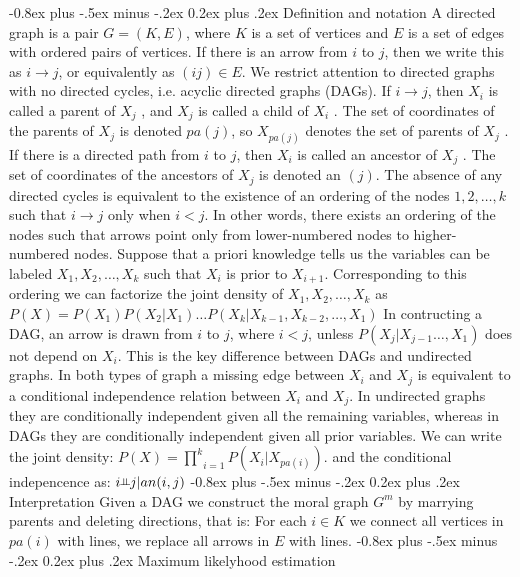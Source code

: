 \documentclass[8pt,landscape]{extarticle}
\makeatletter
\newcommand{\indep}{\rotatebox[origin=c]{90}{$\vDash$}}
\renewcommand{\subsection}{\@startsection{subsection}{2}{0mm}%
                                {-0.8ex plus -.5ex minus -.2ex}%
                                {0.2ex plus .2ex}%
                                {\normalfont\normalsize\bfseries}}
\makeatother
\begin{document}
\begin{multicols}{3}
\subsection{Definition and notation}
A directed graph is a pair $G = (K, E)$, where $K$ is a set of vertices and $E$
is a set of edges with ordered pairs of vertices.
If there is an arrow from $i$ to $j$,
then we write this as $i \to j$, or equivalently as $(ij) \in E$.
We restrict attention to directed graphs with no directed cycles,
i.e. acyclic directed graphs (DAGs). If $i \to j$,
then $X_i$ is called a parent of $X_j$ ,
and $X_j$ is called a child of $X_i$ .
The set of coordinates of the parents of $X_j$ is denoted $pa(j)$, so
$X_{pa(j)}$ denotes the set of parents of $X_j$ .
If there is a directed path from $i$ to $j$,
then $X_i$ is called an ancestor of $X_j$ .
The set of coordinates of the ancestors of $X_j$ is denoted an $(j)$.
The absence of any directed cycles is equivalent to the existence of an
ordering of the nodes ${1, 2, \dots , k}$ such that $i \to j$ only when $i < j$.
In other words, there exists an ordering of the nodes such that arrows point
only from lower-numbered nodes to higher-numbered nodes.
Suppose that a priori knowledge tells us the variables can be labeled
$X_1 , X_2 , \dots , X_k$ such that $X_i$ is prior to $X_{i+1}$.
Corresponding to this ordering we can factorize the joint density of
$X_1 , X_2 , \dots , X_k$ as $P(X)=P(X_1)P(X_2|X_1)\dots P(X_k|X_{k-1},X_{k-2},\dots,X_1)$
In contructing a DAG, an arrow is drawn from $i$ to $j$, where $i<j$, unless
$P(X_j|X_{j-1}\dots,X_1)$ does not depend on $X_i$.
This is the key difference between DAGs and undirected graphs.
In both types of graph a missing edge between $X_i$ and $X_j$ is equivalent to
a conditional independence relation between $X_i$ and $X_j$.
In undirected graphs they are conditionally independent given all the remaining
variables, whereas in DAGs they are conditionally independent given all prior
variables. 
We can write the joint density:
$P(X)=\underset{i=1}{\overset{k}{\prod}}P(X_i|X_{pa(i)})$.
and the conditional indepencence as: $i \indep j|an({i,j})$
\subsection{Interpretation}
Given a DAG we construct the moral graph $G^m$ by marrying parents and deleting
directions, that is:
For each $i \in K$ we connect all vertices in $pa(i)$ with lines, we replace all
arrows in $E$ with lines.
\subsection{Maximum likelyhood estimation}

\end{multicols}
\end{document}
